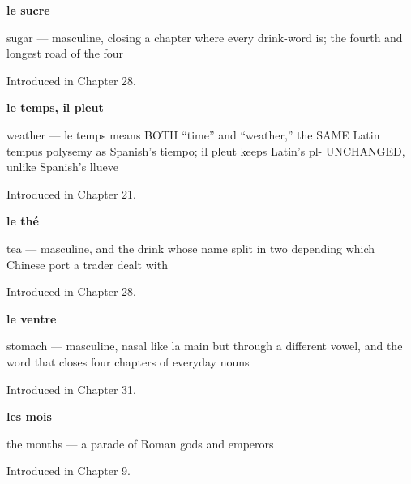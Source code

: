 \noindent\begin{minipage}[t]{\linewidth}
\raggedright
\textbf{le sucre}\par
\small sugar — masculine, closing a chapter where every drink-word is; the fourth and longest road of the four\par
\footnotesize Introduced in Chapter 28.
\end{minipage}\par\medskip

\noindent\begin{minipage}[t]{\linewidth}
\raggedright
\textbf{le temps, il pleut}\par
\small weather — le temps means BOTH \textquotedblleft{}time\textquotedblright{} and \textquotedblleft{}weather,\textquotedblright{} the SAME Latin tempus polysemy as Spanish's tiempo; il pleut keeps Latin's pl- UNCHANGED, unlike Spanish's llueve\par
\footnotesize Introduced in Chapter 21.
\end{minipage}\par\medskip

\noindent\begin{minipage}[t]{\linewidth}
\raggedright
\textbf{le thé}\par
\small tea — masculine, and the drink whose name split in two depending which Chinese port a trader dealt with\par
\footnotesize Introduced in Chapter 28.
\end{minipage}\par\medskip

\noindent\begin{minipage}[t]{\linewidth}
\raggedright
\textbf{le ventre}\par
\small stomach — masculine, nasal like la main but through a different vowel, and the word that closes four chapters of everyday nouns\par
\footnotesize Introduced in Chapter 31.
\end{minipage}\par\medskip

\noindent\begin{minipage}[t]{\linewidth}
\raggedright
\textbf{les mois}\par
\small the months — a parade of Roman gods and emperors\par
\footnotesize Introduced in Chapter 9.
\end{minipage}\par\medskip

